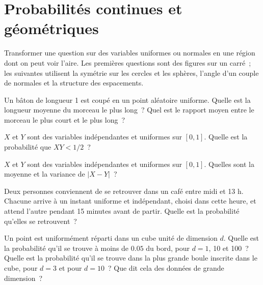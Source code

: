 \chapter{Probabilités continues et géométriques}\label{ch:iv1:continuous-and-geometric-probability}

\begin{ivtrains}
Transformer une question sur des variables uniformes ou normales en une région dont on peut voir l'aire. Les premières questions sont des figures sur un carré~; les suivantes utilisent la symétrie sur les cercles et les sphères, l'angle d'un couple de normales et la structure des espacements.
\end{ivtrains}

\begin{question}\label{iq:iv1:continuous-and-geometric-probability:1}
Un bâton de longueur 1 est coupé en un point aléatoire uniforme. Quelle est la longueur moyenne du morceau le plus long~? Quel est le rapport moyen entre le morceau le plus court et le plus long~?
\end{question}

\begin{question}\label{iq:iv1:continuous-and-geometric-probability:2}
$X$ et $Y$ sont des variables indépendantes et uniformes sur $[0, 1]$. Quelle est la probabilité que $XY < 1/2$~?
\end{question}

\begin{question}\label{iq:iv1:continuous-and-geometric-probability:3}
$X$ et $Y$ sont des variables indépendantes et uniformes sur $[0, 1]$. Quelles sont la moyenne et la variance de $|X - Y|$~?
\end{question}

\begin{question}\label{iq:iv1:continuous-and-geometric-probability:4}
Deux personnes conviennent de se retrouver dans un café entre midi et 13 h. Chacune arrive à un instant uniforme et indépendant, choisi dans cette heure, et attend l'autre pendant 15 minutes avant de partir. Quelle est la probabilité qu'elles se retrouvent~?
\end{question}

\begin{question}\label{iq:iv1:continuous-and-geometric-probability:5}
Un point est uniformément réparti dans un cube unité de dimension $d$. Quelle est la probabilité qu'il se trouve à moins de $0.05$ du bord, pour $d = 1$, 10 et 100~? Quelle est la probabilité qu'il se trouve dans la plus grande boule inscrite dans le cube, pour $d = 3$ et pour $d = 10$~? Que dit cela des données de grande dimension~?
\end{question}

